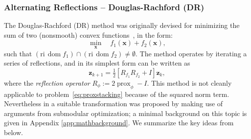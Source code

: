 \documentclass[twoside,11pt]{article}
\newcommand{\vx}{\bm{x}}       \newcommand{\vxh}{\hat{\bm{x}}}        \newcommand{\xh}{\hat{x}}    \newcommand{\vxt}{\tilde{\bm{x}}}       \newcommand{\xt}{\tilde{x}}
\newcommand{\vz}{\bm{z}}       \newcommand{\vzh}{\hat{\bm{z}}}        \newcommand{\zh}{\hat{z}}    \newcommand{\vzt}{\tilde{\bm{z}}}       \newcommand{\zt}{\tilde{z}}
\DeclareMathOperator{\dom}{dom}
\DeclareMathOperator{\prox}{prox}
\newcommand{\half}{\tfrac{1}{2}}
\numberwithin{equation}{section}
\numberwithin{theorem}{section}
\begin{document}
\subsubsection{Alternating Reflections -- Douglas-Rachford (DR)}
\label{sec:DR}
The Douglas-Rachford (DR) method was originally devised for minimizing the sum of two (nonsmooth) convex functions~\citep{Combettes09}, in the form:
\begin{equation}
 \label{eq:DRproblem}
 \min_{\vx} \quad f_1(\vx) + f_2(\vx),
\end{equation}
such that $(\text{ri}\, \dom f_1) \cap  (\text{ri} \, \dom f_2) \neq  \emptyset$. The method operates by iterating a series of reflections, and in its simplest form can be written as
\begin{equation}
 \label{eq:DRsequence}
 \vz_{k+1} = \half \left[ R_{f_1} R_{f_2} + I \right] \vz_k,
\end{equation}
where the \emph{reflection operator} $R_{\phi} := 2 \prox_{\phi} - I$. This method is not cleanly applicable to problem~\eqref{eq:proxstacking} because of the squared norm term. Nevertheless in \citep{jegBac13} a suitable transformation was proposed by making use of arguments from submodular optimization; a minimal background on this topic is given in Appendix \ref{app:mathbackground}. We summarize the key ideas from~\citep{jegBac13} below.
\end{document}
